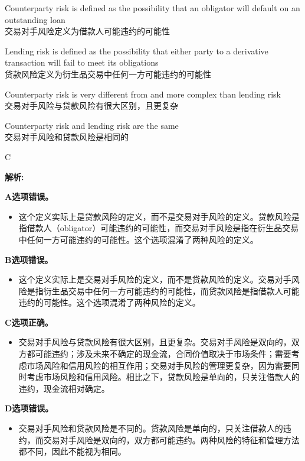 \documentclass{article}
\newenvironment{explanation}
{\textbf{解析:}\par}
{\par}
\begin{document}
\begin{choices}
    \item Counterparty risk is defined as the possibility that an obligator will default on an outstanding loan\\
    交易对手风险定义为借款人可能违约的可能性
    \item Lending risk is defined as the possibility that either party to a derivative transaction will fail to meet its obligations\\
    贷款风险定义为衍生品交易中任何一方可能违约的可能性
    \item Counterparty risk is very different from and more complex than lending risk\\
    交易对手风险与贷款风险有很大区别，且更复杂
    \item Counterparty risk and lending risk are the same\\
    交易对手风险和贷款风险是相同的
\end{choices}

\begin{correctanswer}
    C
\end{correctanswer}

\begin{explanation}

    \textbf{A选项错误。}
    \begin{itemize}
        \item 这个定义实际上是贷款风险的定义，而不是交易对手风险的定义。贷款风险是指借款人（obligator）可能违约的可能性，而交易对手风险是指在衍生品交易中任何一方可能违约的可能性。这个选项混淆了两种风险的定义。
    \end{itemize}

    \textbf{B选项错误。}
    \begin{itemize}
        \item 这个定义实际上是交易对手风险的定义，而不是贷款风险的定义。交易对手风险是指衍生品交易中任何一方可能违约的可能性，而贷款风险是指借款人可能违约的可能性。这个选项混淆了两种风险的定义。
    \end{itemize}

    \textbf{C选项正确。}
    \begin{itemize}
        \item 交易对手风险与贷款风险有很大区别，且更复杂。交易对手风险是双向的，双方都可能违约；涉及未来不确定的现金流，合同价值取决于市场条件；需要考虑市场风险和信用风险的相互作用；交易对手风险的管理更复杂，因为需要同时考虑市场风险和信用风险。相比之下，贷款风险是单向的，只关注借款人的违约，现金流相对确定。
    \end{itemize}

    \textbf{D选项错误。}
    \begin{itemize}
        \item 交易对手风险和贷款风险是不同的。贷款风险是单向的，只关注借款人的违约，而交易对手风险是双向的，双方都可能违约。两种风险的特征和管理方法都不同，因此不能视为相同。
    \end{itemize}

\end{explanation}
\end{document}
